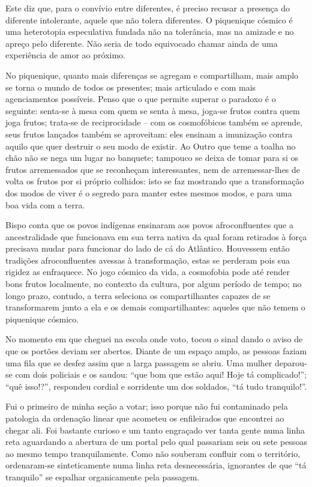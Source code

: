 Este diz que, para o convívio entre diferentes, é preciso recusar a presença do diferente intolerante, aquele que não tolera diferentes. O piquenique cósmico é uma heterotopia especulativa fundada não  na tolerância, mas na amizade e no apreço pelo diferente. Não seria de todo equivocado chamar ainda de uma experiência de amor ao próximo.

No piquenique, quanto mais diferenças se agregam e compartilham, mais amplo se torna o mundo de todos os presentes; mais articulado e com mais agenciamentos possíveis. Penso que o que permite superar o paradoxo é o seguinte: senta-se à mesa com quem se senta à mesa, joga-se frutos contra quem joga frutos; trata-se de reciprocidade -- com os cosmofóbicos também se aprende, seus frutos lançados também se aproveitam: eles ensinam a imunização contra aquilo que quer destruir o seu modo de existir. Ao Outro que teme a toalha no chão não se nega um lugar no banquete; tampouco se deixa de tomar para si os frutos arremessados que se reconheçam interessantes, nem de arremessar-lhes de volta os frutos por si próprio colhidos: isto se faz mostrando que a transformação dos modos de viver é o segredo para manter estes mesmos modos, e para uma boa vida com a terra.

Bispo conta que os povos indígenas ensinaram aos povos afroconfluentes que a ancestralidade que funcionava em sua terra nativa da qual foram retirados à força precisava mudar para funcionar do lado de cá do Atlântico. Houvessem então tradições afroconfluentes avessas à transformação, estas se perderam pois sua rigidez as enfraquece. No jogo cósmico da vida, a cosmofobia pode até render bons frutos localmente, no contexto da cultura, por algum período de tempo; no longo prazo, contudo, a terra seleciona os compartilhantes capazes de se transformarem junto a ela e os demais compartilhantes: aqueles que não temem o piquenique cósmico.


No momento em que cheguei na escola onde voto, tocou o sinal dando o aviso de que os portões deviam ser abertos. Diante de um espaço amplo, as pessoas faziam uma fila que se desfez assim que a larga passagem se abriu. Uma mulher deparou-se com dois policiais e os saudou: \enquote{que bom que estão aqui! Hoje tá complicado!}; \enquote{quê isso!?}, respondeu cordial e sorridente um dos soldados, \enquote{tá tudo tranquilo!}.

Fui o primeiro de minha seção a votar; isso porque não fui contaminado pela patologia da ordenação linear que acometeu os enfileirados que encontrei ao chegar ali. Foi bastante curioso e um tanto engraçado ver tanta gente numa linha reta aguardando a abertura de um portal pelo qual passariam seis ou sete pessoas ao mesmo tempo tranquilamente. Como não souberam confluir com o território, ordenaram-se sinteticamente numa linha reta desnecessária, ignorantes de que \enquote{tá tranquilo} se espalhar organicamente pela passagem.

